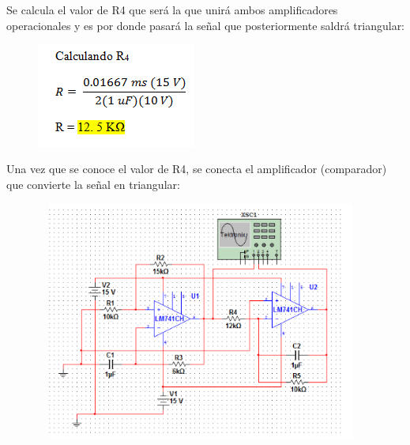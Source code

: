 \documentclass[12pt]{article}
\begin{document}

\par

\begin{Center}
\textcolor[HTML]{656565}{Se calcula el valor de R4 que será la que unirá ambos amplificadores operacionales y es por donde pasará la señal que posteriormente saldrá triangular:}
\end{Center}\par




\begin{figure}[H]
	\begin{Center}
		\includegraphics[width=2.05in,height=1.35in]{./media/image7.png}
	\end{Center}
\end{figure}



\par

\setlength{\parskip}{8.04pt}

\vspace{\baselineskip}
\begin{Center}
\textcolor[HTML]{656565}{Una vez que se conoce el valor de R4, se conecta el amplificador (comparador) que convierte la señal en triangular:}
\end{Center}\par




\begin{figure}[H]
	\begin{Center}
		\includegraphics[width=4.3in,height=3.1in]{./media/image8.png}
	\end{Center}
\end{figure}
\end{document}
